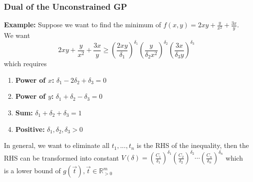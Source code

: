 \documentclass[11pt,a4paper]{article}
\begin{document}
\subsubsection{Dual of the Unconstrained GP}
\textbf{Example:} Suppose we want to find the minimum of $f(x,y)=2xy+\frac{y}{x^2}+\frac{3x}{y}$.\\
We want $$2xy+\frac{y}{x^2}+\frac{3x}{y}\geq \left(\frac{2xy}{\delta_1}\right)^{\delta_1}\left(\frac{y}{\delta_2 x^2}\right)^{\delta_2}\left(\frac{3x}{\delta_3 y}\right)^{\delta_3}$$
which requires
\begin{enumerate}[(1)]
    \item \textbf{Power of $x$:} $\delta_1-2\delta_2+\delta_3=0$
    \item \textbf{Power of $y$:} $\delta_1+\delta_2-\delta_3=0$
    \item \textbf{Sum:} $\delta_1+\delta_2+\delta_3=1$
    \item \textbf{Positive:} $\delta_1,\delta_2,\delta_3>0$
\end{enumerate}
In general, we want to eliminate all $t_1,...,t_n$ is the RHS of the inequality, then the RHS can be transformed into constant $V(\delta)=\left(\frac{C_1}{\delta_1}\right)^{\delta_1}\left(\frac{C_2}{\delta_2}\right)^{\delta_2}\cdots\left(\frac{C_n}{\delta_n}\right)^{\delta_n}$ which is a lower bound of $g(\vec{t}),\vec{t}\in \mathbb{R}_{>0}^m$

\begin{center}
\end{center}
\end{document}
